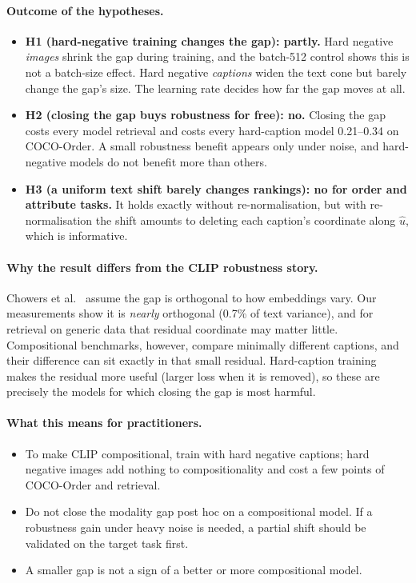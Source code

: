 \documentclass[11pt,a4paper]{article}
\newcommand{\uhat}{\hat{u}}
\begin{document}
\paragraph{Outcome of the hypotheses.}
\begin{itemize}
\item \textbf{H1 (hard-negative training changes the gap): partly.} Hard negative \emph{images} shrink the
gap during training, and the batch-512 control shows this is not a batch-size effect. Hard negative
\emph{captions} widen the text cone but barely change the gap's size. The learning rate decides how far
the gap moves at all.
\item \textbf{H2 (closing the gap buys robustness for free): no.} Closing the gap costs every model
retrieval and costs every hard-caption model 0.21--0.34 on COCO-Order. A small robustness benefit
appears only under noise, and hard-negative models do not benefit more than others.
\item \textbf{H3 (a uniform text shift barely changes rankings): no for order and attribute tasks.} It holds
exactly without re-normalisation, but with re-normalisation the shift amounts to deleting each
caption's coordinate along $\uhat$, which is informative.
\end{itemize}

\paragraph{Why the result differs from the CLIP robustness story.}
Chowers et al.\ \cite{chowers} assume the gap is orthogonal to how embeddings vary. Our measurements show
it is \emph{nearly} orthogonal (0.7\% of text variance), and for retrieval on generic data that residual
coordinate may matter little. Compositional benchmarks, however, compare minimally different captions,
and their difference can sit exactly in that small residual. Hard-caption training makes the residual more
useful (larger loss when it is removed), so these are precisely the models for which closing the gap is
most harmful.

\paragraph{What this means for practitioners.}
\begin{itemize}
\item To make CLIP compositional, train with hard negative captions; hard negative images add nothing to
compositionality and cost a few points of COCO-Order and retrieval.
\item Do not close the modality gap post hoc on a compositional model. If a robustness gain under heavy
noise is needed, a partial shift should be validated on the target task first.
\item A smaller gap is not a sign of a better or more compositional model.
\end{itemize}
\end{document}
